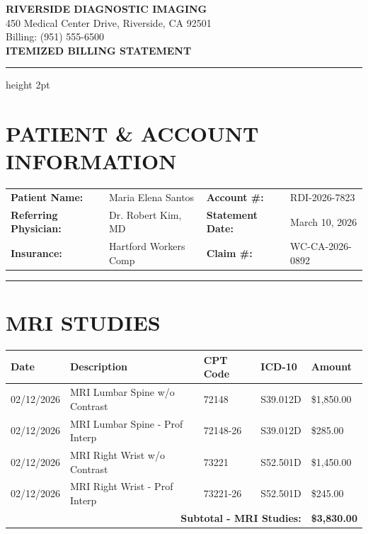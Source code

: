 \documentclass[11pt]{article}
\begin{document}
\begin{center}
{\Large\bfseries\color{medblue} RIVERSIDE DIAGNOSTIC IMAGING}\\[0.3em]
{\small 450 Medical Center Drive, Riverside, CA 92501}\\
{\small Billing: (951) 555-6500}\\[1em]
{\LARGE\bfseries ITEMIZED BILLING STATEMENT}
\end{center}

\vspace{0.5em}
\hrule height 2pt
\vspace{1em}

\section*{PATIENT \& ACCOUNT INFORMATION}

\begin{tabular}{@{}p{4cm}p{5cm}p{3.5cm}p{4cm}@{}}
\textbf{Patient Name:} & Maria Elena Santos & \textbf{Account \#:} & RDI-2026-7823 \\
\textbf{Referring Physician:} & Dr. Robert Kim, MD & \textbf{Statement Date:} & March 10, 2026 \\
\textbf{Insurance:} & Hartford Workers Comp & \textbf{Claim \#:} & WC-CA-2026-0892 \\
\end{tabular}

\vspace{1em}
\hrule
\vspace{1em}

\section*{MRI STUDIES}

\begin{longtable}{@{}p{2cm}p{5.5cm}p{2cm}p{2cm}p{2.5cm}@{}}
\toprule
\textbf{Date} & \textbf{Description} & \textbf{CPT Code} & \textbf{ICD-10} & \textbf{Amount} \\
\midrule
\endhead

02/12/2026 & MRI Lumbar Spine w/o Contrast & 72148 & S39.012D & \$1,850.00 \\
02/12/2026 & MRI Lumbar Spine - Prof Interp & 72148-26 & S39.012D & \$285.00 \\
02/12/2026 & MRI Right Wrist w/o Contrast & 73221 & S52.501D & \$1,450.00 \\
02/12/2026 & MRI Right Wrist - Prof Interp & 73221-26 & S52.501D & \$245.00 \\
\midrule
\multicolumn{4}{r}{\textbf{Subtotal - MRI Studies:}} & \textbf{\$3,830.00} \\
\bottomrule
\end{longtable}
\end{document}
